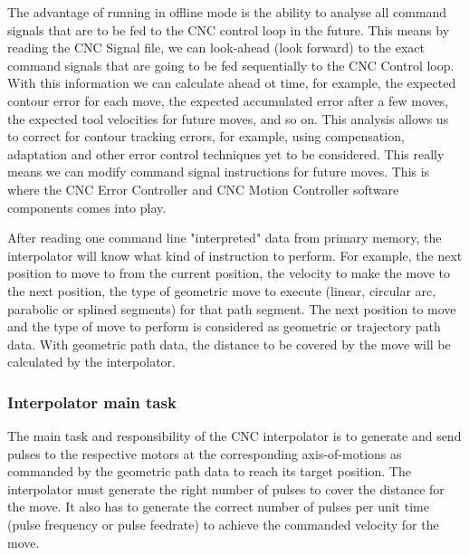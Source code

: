 \begin{tcolorbox}[colback=green!15!white,colframe=red!75!black,title=Research consideration no. 1]
\justifying 
The advantage of running in offline mode is the ability to analyse all command signals that are to be fed to the CNC control loop in the future. This means by reading the CNC Signal file, we can look-ahead (look forward) to the exact command signals that are going to be fed sequentially to the CNC Control loop. With this information we can calculate ahead ot time, for example, the expected contour error for each move, the expected accumulated error after a few moves, the expected tool velocities for future moves, and so on. This analysis allows us to correct for contour tracking errors, for example, using compensation, adaptation and other error control techniques yet to be considered. This really means we can modify command signal instructions for future moves. This is where the CNC Error Controller and CNC Motion Controller software components comes into play.   
\end{tcolorbox}

After reading one command line "interpreted" data from primary memory, the interpolator will know what kind of instruction to perform. For example, the next position to move to from the current position, the velocity to make the move to the next position, the type of geometric move to execute (linear, circular arc, parabolic or splined segments) for that path segment. The next position to move and the type of move to perform is considered as geometric or trajectory path data. With geometric path data, the distance to be covered by the move will be calculated by the interpolator.

\subsubsection{Interpolator main task}
	
The main task and responsibility of the CNC interpolator is to generate and send pulses to the respective motors at the corresponding axis-of-motions as commanded by the geometric path data to reach its target position. The interpolator must generate the right number of pulses to cover the distance for the move. It also has to generate the correct number of pulses per unit time (pulse frequency or pulse feedrate) to achieve the commanded velocity for the move. 
\vspace*{1\baselineskip}

